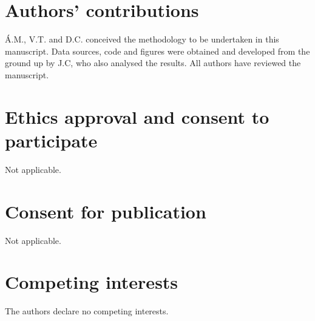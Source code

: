 \documentclass[10pt,twocolumn]{wlscirep}
\begin{document}
\section*{Authors' contributions} \label{sec-authors-contributions}

Á.M., V.T. and D.C. conceived the methodology to be undertaken in this manuscript. Data sources, code and figures were obtained and developed from the ground up by J.C, who also analysed the results. All authors have reviewed the manuscript.

\section*{Ethics approval and consent to participate} \label{sec-ethics-approval}
Not applicable.

\section*{Consent for publication} \label{sec-consent-for-publication}
Not applicable.

\section*{Competing interests} \label{sec-competing-interests}
The authors declare no competing interests.


\end{document}
